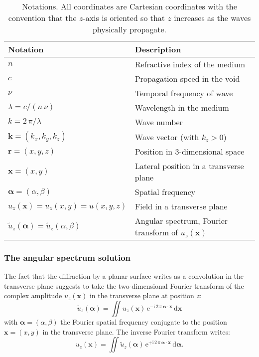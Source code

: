 \documentclass[a4paper]{article}
\newcommand{\V}[1]{\boldsymbol{#1}}
\newcommand*{\mathd}{\mathrm{d}}
\newcommand*{\mathe}{\mathrm{e}}
\newcommand*{\mathi}{\mathrm{i}}
\newcommand*{\FT}[1]{\widetilde{#1}}
\begin{document}
\begin{table}[t]
  \centering
  \begin{tabular}{ll}
    Notation & Description \\
    \hline
    $n$ & Refractive index of the medium\\
    $c$ & Propagation speed in the void\\
    $ν$ & Temporal frequency of wave\\
    $λ= c/(n\,ν)$ & Wavelength in the medium\\
    $k = 2\,π/λ$ & Wave number\\
    $\V{k} = (k_{x},k_{y},k_{z})$ & Wave vector (with $k_{z} > 0$)\\
    $\V{r} = (x,y,z)$ & Position in 3-dimensional space\\
    $\V{x} = (x,y)$ & Lateral position in a transverse plane\\
    $\V{α} = (α,β)$ & Spatial frequency\\
    $u_{z}(\V{x}) = u_{z}(x,y) = u(x,y,z)$ & Field in a transverse plane\\
    $\FT{u}_{z}(\V{α}) = \FT{u}_{z}(α,β)$
             & Angular spectrum, Fourier transform of $u_{z}(\V{x})$\\
  \end{tabular}
  \caption{Notations. All coordinates are Cartesian coordinates with the
    convention that the $z$-axis is oriented so that $z$ increases as the waves
    physically propagate.}
  \label{tab:notations}
\end{table}


\subsubsection{The angular spectrum solution}
\label{sec:angular-spectrum}

The fact that the diffraction by a planar surface writes as a convolution in
the transverse plane suggests to take the two-dimensional Fourier transform of
the complex amplitude $u_{z}(\V{x})$ in the transverse plane at position $z$:
\begin{equation}
  \label{eq:angular-spectrum}
  \FT{u}_{z}(\V{α}) = \iint u_{z}(\V{x})\,
  \mathe^{-\mathi\,2\,π\,\V{α}·\V{x}}\,
  \mathd\V{x}
\end{equation}
with $\V{α} = (α,β)$ the Fourier spatial frequency conjugate to the position
$\V{x} = (x,y)$ in the transverse plane. The inverse Fourier transform writes:
\begin{equation}
  \label{eq:angular-spectrum-inverse}
  u_{z}(\V{x}) = \iint \FT{u}_{z}(\V{α})\,
  \mathe^{+\mathi\,2\,π\,\V{α}·\V{x}}\,
  \mathd\V{α}.
\end{equation}
\end{document}
